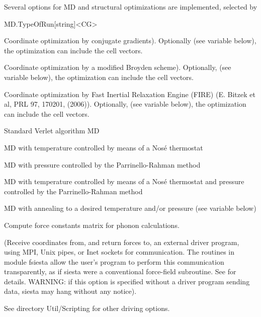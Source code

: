 Several options for MD and structural optimizations are
implemented, selected by
\begin{fdfentry}{MD.TypeOfRun}[string]<CG>

  \begin{fdfoptions}
    
    \option[CG]%
    Coordinate optimization by conjugate gradients). Optionally (see
    variable  below), the optimization can include the
    cell vectors.

    \option[Broyden]%
    Coordinate optimization by a modified Broyden scheme). Optionally,
    (see variable  below), the optimization can
    include the cell vectors.

    \option[FIRE]%
    Coordinate optimization by Fast Inertial Relaxation Engine (FIRE)
    (E. Bitzek et al, PRL 97, 170201, (2006)).  Optionally, (see
    variable  below), the optimization can
    include the cell vectors.

    \option[Verlet]%
    Standard Verlet algorithm MD

    \option[Nose]%
    MD with temperature controlled  by means of a Nos\'e
    thermostat

    \option[ParrinelloRahman]%
    MD with pressure controlled by the Parrinello-Rahman method

    \option[NoseParrinelloRahman]%
    MD with temperature controlled by means of a Nos\'e thermostat and
    pressure controlled by the Parrinello-Rahman method

    \option[Anneal]%
    MD with annealing to a desired temperature and/or pressure (see
    variable  below)

    \option[FC]%
    Compute force constants matrix for
    phonon calculations.


    \option[Forces]%
    (Receive coordinates from, and return forces to, an external
    driver program, using MPI, Unix pipes, or Inet sockets for
    communication.  The routines in module fsiesta allow the user's
    program to perform this communication transparently, as if siesta
    were a conventional force-field subroutine. See
     for details. WARNING: if
    this option is specified without a driver program sending data,
    siesta may hang without any notice).
    
    See directory Util/Scripting  for other driving
    options.


\end{fdfoptions}
\end{fdfentry}
